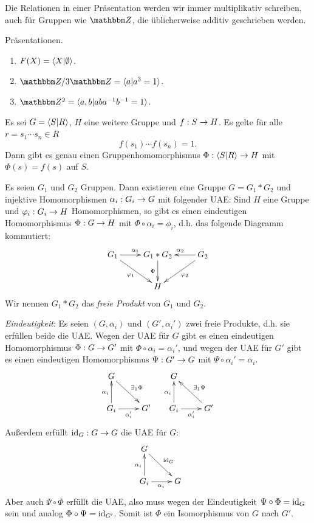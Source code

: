 \documentclass[a4paper, 12pt, twoside]{article}
\begin{document}
Die Relationen in einer Präsentation werden wir immer multiplikativ
schreiben, auch für Gruppen wie $\ZZ$, die üblicherweise additiv
geschrieben werden.

\BSP Präsentationen.
\begin{enumerate}
\item $F(X) = \langle X | \emptyset\rangle$.
\item $\ZZ/3\ZZ = \lag a | a^3=1 \rag$.
\item $\ZZ^2 = \lag a,b | aba^{-1}b^{-1}=1 \rag$.
\end{enumerate}

\BEM Es sei $G=\langle S | R \rangle$, $H$ eine weitere Gruppe und
$f:S\rightarrow H$. Es gelte für alle $r=s_1\cdots s_n\in R$
\[
f(s_1)\cdots f(s_n) = 1.
\]
Dann gibt es genau einen Gruppenhomomorphismus
$\Phi:\langle S|R \rangle \rightarrow H$ mit $\Phi(s)=f(s)$ auf $S$.

\PROP\label{prop_FP}
Es seien $G_1$ und $G_2$ Gruppen. Dann existieren eine Gruppe
$G=G_1*G_2$ und injektive Homomorphismen $\alpha_i:G_i\rightarrow G$ mit
folgender UAE:
Sind $H$ eine Gruppe und $\varphi_i:G_i\rightarrow H$ Homomorphismen, so
gibt es einen eindeutigen Homomorphismus $\Phi:G\rightarrow H$ mit
$\Phi\circ\alpha_i=\phi_i$, d.h. das folgende Diagramm kommutiert:
\[\xymatrix{
G_1 \ar[r]^{\alpha_1} \ar[dr]_{\phi_1} & G_1*G_2 \ar[d]_{\Phi}&
G_2 \ar[l]_{\alpha_2} \ar[dl]^{\phi_2}\\
& H  &
}\]
Wir nennen $G_1*G_2$ das \emph{freie Produkt}
von $G_1$ und $G_2$.

\bew \textsl{Eindeutigkeit}: Es seien $(G, \alpha_i)$ und
$(G',\alpha_i')$ zwei freie Produkte, d.h. sie erfüllen beide die UAE.
Wegen der UAE für $G$ gibt es einen eindeutigen Homomorphismus
$\Phi:G \rightarrow G'$ mit $\Phi\circ\alpha_i=\alpha_i'$, und wegen der UAE
für $G'$ gibt es einen eindeutigen Homomorphismus
$\Psi:G'\rightarrow G$ mit $\Psi\circ\alpha_i' = \alpha_i$.
\[\xymatrix{
G \ar[dr]^{\exists_1 \Phi} & \\
G_i \ar[u]^{\alpha_i}\ar[r]_{\alpha_i'} & G'
}\quad
\xymatrix{
G  & \\
G_i \ar[u]^{\alpha_i}\ar[r]_{\alpha_i'} & G'\ar[ul]_{\exists_1 \Psi}
}
\]
Außerdem erfüllt $\mathrm{id}_G:G\rightarrow G$ die UAE für $G$:
\[\xymatrix{
G \ar[dr]^{\id_G} & \\
G_i \ar[u]^{\alpha_i}\ar[r]_{\alpha_i} & G
}
\]
Aber auch $\Psi\circ\Phi$ erfüllt die UAE, also muss wegen der
Eindeutigkeit $\Psi\circ\Phi=\mathrm{id}_G$ sein und analog
$\Phi\circ\Psi=\mathrm{id}_{G'}$. Somit ist $\Phi$ ein Isomorphismus
von $G$ nach $G'$.
\end{document}
